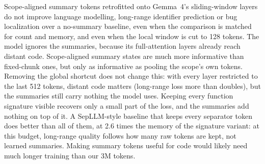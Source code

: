 \documentclass[11pt]{article}
\begin{document}
Scope-aligned summary tokens retrofitted onto Gemma~4's sliding-window layers
do not improve language modelling, long-range identifier prediction or bug
localization over a no-summary baseline, even when the comparison is matched
for count and memory, and even when the local window is cut to 128 tokens.
The model ignores the summaries, because its full-attention layers already
reach distant code. Scope-aligned summary states are much more informative
than fixed-chunk ones, but only as informative as pooling the scope's own
tokens. Removing the global shortcut does not change this: with every layer
restricted to the last 512 tokens, distant code matters (long-range loss
more than doubles), but the summaries still carry nothing the model uses.
Keeping every function signature visible recovers only a small part of
the loss, and the summaries add nothing on top of it. A SepLLM-style
baseline that keeps every separator token does better than all of them, at
2.6 times the memory of the signature variant: at this budget, long-range
quality follows how many raw tokens are kept, not learned summaries. Making
summary tokens useful for code would likely need much longer training than
our 3M tokens.
\end{document}
